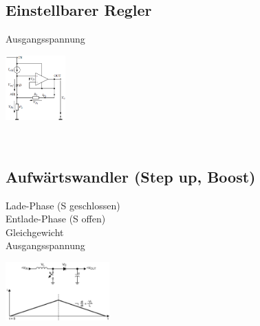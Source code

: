         \subsection{Einstellbarer Regler}
        \begin{minipage}[T]{14cm}
            Ausgangsspannung
            \hspace{13mm}\\
        \end{minipage}
        \begin{minipage}{5cm}
            \includegraphics[height=2.5cm]{./bilder/ReglerEinstellbar.png}
        \end{minipage}\\
        
        \subsection{Aufw\"artswandler (Step up, Boost)}
        \begin{minipage}[T]{14cm}
            Lade-Phase (S geschlossen)
            \hspace{0.5mm}\\  
            Entlade-Phase (S offen)
            \hspace{5.8mm}\\  
            Gleichgewicht
            \hspace{21mm}\\  
            Ausgangsspannung
            \hspace{13mm}\\
        \end{minipage}
        \begin{minipage}{5cm}
            \includegraphics[width=4cm]{./bilder/ReglerStepUpStromverlauf.png}
        \end{minipage}\\
        
